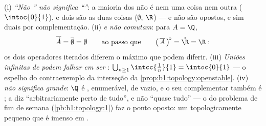 \begin{remark}
(i) \emph{``Não '' não significa ``''}: a maioria dos
 não é nem uma coisa nem outra ($\intoc{0}{1}$), e dois 
são as duas coisas ($\emptyset$, $\R$) ---  e  não são
opostos, e sim duais por complementação. (ii) \emph{ e 
não comutam}: para $A = \Q$,
\[
\overline{\mathring A} = \overline\emptyset = \emptyset
\qquad\text{ao passo que}\qquad
\bigl(\,\overline A\,\bigr)^{\!\circ} = \mathring \R = \R :
\]
os dois operadores iterados diferem o máximo que  podem
diferir. (iii) \emph{Uniões infinitas de  podem falhar em ser
}: $\bigcup_{n\geq1} \intcc{\frac1n}{1} = \intoc{0}{1}$ --- o
espelho do contraexemplo da interseção da
\cref{prop:b1:topology:openstable}. (iv) \emph{ não significa
grande}: $\Q$ é , enumerável, de  vazio, e o seu
complementar também é ; a  diz ``arbitrariamente perto de
tudo'', e não ``quase tudo'' --- o  do problema de
fim de semana (\cref{pb:b1:topology:1}) faz o ponto oposto: um
 topologicamente pequeno que é imenso em .
\end{remark}

